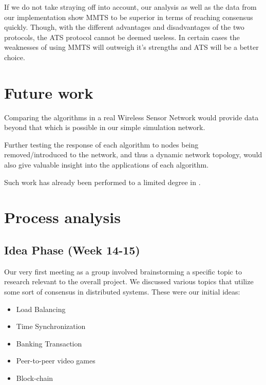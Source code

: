 \documentclass[a4paper,12pt]{article}
\begin{document}
If we do not take straying off into account, our analysis as well as the data from our implementation show MMTS to be superior in terms of reaching consensus quickly. Though, with the different advantages and disadvantages of the two protocols, the ATS protocol cannot be deemed useless. In certain cases the weaknesses of using MMTS will outweigh it's strengths and ATS will be a better choice.

\section{Future work}
Comparing the algorithms in a real Wireless Sensor Network would provide data beyond that which is possible in our simple simulation network.

Further testing the response of each algorithm to nodes being removed/introduced to the network, and thus a dynamic network topology, would also give valuable insight into the applications of each algorithm.

Such work has already been performed to a limited degree in \citet{HeLiChenCheng13}.


\clearpage
\appendix

\section{Process analysis}

\subsection{Idea Phase (Week 14-15)}
Our very first meeting as a group involved brainstorming a specific topic to research relevant to the overall project. We discussed various topics that utilize some sort of consensus in distributed systems. These were our initial ideas:

\begin{itemize}
    \item Load Balancing
    \item Time Synchronization
    \item Banking Transaction
    \item Peer-to-peer video games
    \item Block-chain
\end{itemize}
\end{document}

